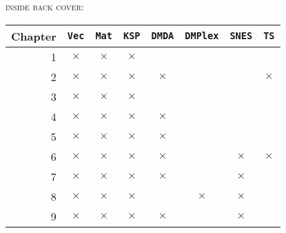 \documentclass{tufte-book}
\theoremstyle{definition}
\newcommand{\XX}{$\bm{\times}$}  %
\newcommand{\gX}{{\color{Gray} $\times$}}
\newcommand{\pDMDA}{\texttt{DMDA}\xspace}
\newcommand{\pDMPlex}{\texttt{DMPlex}\xspace}
\newcommand{\pKSP}{\texttt{KSP}\xspace}
\newcommand{\pMat}{\texttt{Mat}\xspace}
\newcommand{\pSNES}{\texttt{SNES}\xspace}
\newcommand{\pTS}{\texttt{TS}\xspace}
\newcommand{\pVec}{\texttt{Vec}\xspace}
\begin{document}
\newpage\thispagestyle{empty}
\noindent \textsc{inside back cover:}

\vfill
\begin{center}
\begin{tabular}{rccccccc}
\toprule
Chapter 
    &\;\pVec\; &\;\pMat\;
                &\;\pKSP\; &\pDMDA
                            &\pDMPlex
                                  &\pSNES &\;\pTS\; \\
\midrule
1   & \XX & \XX & \XX &     &     &     &      \\
2   & \XX & \XX & \XX & \XX &     &     & \XX  \\
3   & \XX & \XX & \XX &     &     &     &      \\
4   & \gX & \gX & \XX & \XX &     &     &      \\
5   & \gX & \gX & \XX & \XX &     &     &      \\
6   & \gX & \gX & \XX & \XX &     & \XX & \XX  \\
7   & \gX & \gX & \gX & \XX &     & \XX &      \\
8   & \gX & \gX & \XX &     & \XX & \XX &      \\
9   & \gX & \gX & \gX & \XX &     & \XX &      \\
\bottomrule
\end{tabular}
\end{center}
\vfill
\end{document}
